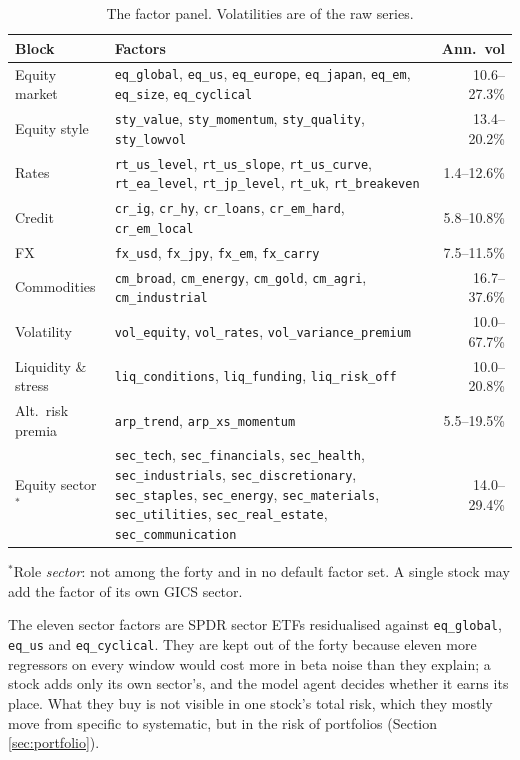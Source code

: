 \documentclass[11pt,a4paper]{article}
\newcommand{\code}[1]{\texttt{\small #1}}
\begin{document}
\begin{table}[htbp]
\centering
\caption{The factor panel. Volatilities are of the raw series.}
\label{tab:blocks}
\small
\begin{tabularx}{\textwidth}{@{}lXr@{}}
\toprule
\textbf{Block} & \textbf{Factors} & \textbf{Ann.\ vol} \\
\midrule
Equity market & \code{eq\_global}, \code{eq\_us}, \code{eq\_europe}, \code{eq\_japan}, \code{eq\_em}, \code{eq\_size}, \code{eq\_cyclical} & 10.6--27.3\% \\
Equity style & \code{sty\_value}, \code{sty\_momentum}, \code{sty\_quality}, \code{sty\_lowvol} & 13.4--20.2\% \\
Rates & \code{rt\_us\_level}, \code{rt\_us\_slope}, \code{rt\_us\_curve}, \code{rt\_ea\_level}, \code{rt\_jp\_level}, \code{rt\_uk}, \code{rt\_breakeven} & 1.4--12.6\% \\
Credit & \code{cr\_ig}, \code{cr\_hy}, \code{cr\_loans}, \code{cr\_em\_hard}, \code{cr\_em\_local} & 5.8--10.8\% \\
FX & \code{fx\_usd}, \code{fx\_jpy}, \code{fx\_em}, \code{fx\_carry} & 7.5--11.5\% \\
Commodities & \code{cm\_broad}, \code{cm\_energy}, \code{cm\_gold}, \code{cm\_agri}, \code{cm\_industrial} & 16.7--37.6\% \\
Volatility & \code{vol\_equity}, \code{vol\_rates}, \code{vol\_variance\_premium} & 10.0--67.7\% \\
Liquidity \& stress & \code{liq\_conditions}, \code{liq\_funding}, \code{liq\_risk\_off} & 10.0--20.8\% \\
Alt.\ risk premia & \code{arp\_trend}, \code{arp\_xs\_momentum} & 5.5--19.5\% \\
\midrule
Equity sector$^{\ast}$ & \code{sec\_tech}, \code{sec\_financials}, \code{sec\_health}, \code{sec\_industrials}, \code{sec\_discretionary}, \code{sec\_staples}, \code{sec\_energy}, \code{sec\_materials}, \code{sec\_utilities}, \code{sec\_real\_estate}, \code{sec\_communication} & 14.0--29.4\% \\
\bottomrule
\end{tabularx}

\smallskip
{\footnotesize $^{\ast}$Role \emph{sector}: not among the forty and in no default
factor set. A single stock may add the factor of its own GICS sector.\par}
\end{table}

The eleven sector factors are SPDR sector ETFs residualised against
\code{eq\_global}, \code{eq\_us} and \code{eq\_cyclical}. They are kept out of the
forty because eleven more regressors on every window would cost more in beta noise
than they explain; a stock adds only its own sector's, and the model agent decides
whether it earns its place. What they buy is not visible in one stock's total risk,
which they mostly move from specific to systematic, but in the risk of portfolios
(Section \ref{sec:portfolio}).
\end{document}
